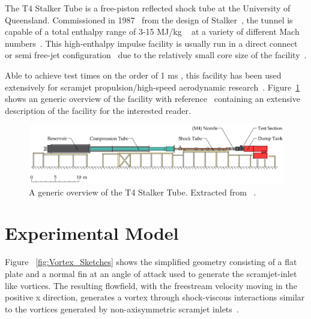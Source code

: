 \documentclass{AIAA}
\begin{document}
The T4 Stalker Tube is a free-piston reflected shock tube at the University of Queensland. 
Commissioned in 1987~\cite{Doherty:PhD_Thesis_Scram_M10} from the design of Stalker~\cite{Stalker1966}, the tunnel is capable of a total enthalpy range of 3-15 MJ/kg ~\cite{Doherty:PhD_Thesis_Scram_M10} at a variety of different Mach numbers~\cite{Tanimizu:Phd_Thesis}.
This high-enthalpy impulse facility is usually run in a direct connect~\cite{Kirchhartz:PhD_Thesis_Boundary_Combustion, RidingsAndrewNoel2015Iops} or semi free-jet configuration~\cite{Chan:Boundary_Layer_Combustion_Perturbation, Wise_Thesis} due to the relatively small core size of the facility~\cite{Itoh1999, Stalker_2005}.


Able to achieve test times on the order of 1 ms \cite{Stalker_2005}, this facility has been used extensively for scramjet propulsion/high-speed aerodynamic research~\cite{Hunt2009, Wise2014b}.
Figure~\ref{fig:T4_Overview} shows an generic overview of the facility with reference~\cite{Doherty:PhD_Thesis_Scram_M10} containing an extensive description of the facility for the interested reader.

\begin{figure}[h]
\centering
	\includegraphics[trim = 0mm 0mm 0mm 0mm, clip, width=0.9\columnwidth]{Figures/T4_Shock_Tunnel_Luke_D_2013.eps}
	\caption{A generic overview of the T4 Stalker Tube. Extracted from ~\cite{Doherty:PhD_Thesis_Scram_M10}.}
	\label{fig:T4_Overview}	
\end{figure}


\section{Experimental Model}
	\label{sec:ModelDescription}

Figure ~\ref{fig:Vortex_Sketches} shows the simplified geometry consisting of a flat plate and a normal fin at an angle of attack used to generate the scramjet-inlet like vortices.
The resulting flowfield, with the freestream velocity moving in the positive x direction, generates a vortex through shock-viscous interactions similar to the vortices generated by non-axisymmetric scramjet inlets~\cite{Llobet_PlumeElongation,AFMCpaper2014}.
\end{document}

